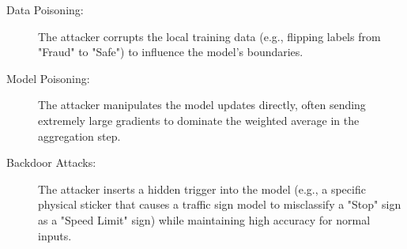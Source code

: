 \begin{description}
  \item[Data Poisoning:] 
        The attacker corrupts the local training data (e.g., flipping labels from "Fraud" to "Safe") to influence the model's boundaries.
  \item[Model Poisoning:]
        The attacker manipulates the model updates directly, often sending extremely large gradients to dominate the weighted average in the aggregation step.
  \item[Backdoor Attacks:]
        The attacker inserts a hidden trigger into the model (e.g., a specific physical sticker that causes a traffic sign model to misclassify a "Stop" sign as a "Speed Limit" sign) while maintaining high accuracy for normal inputs.
\end{description}

